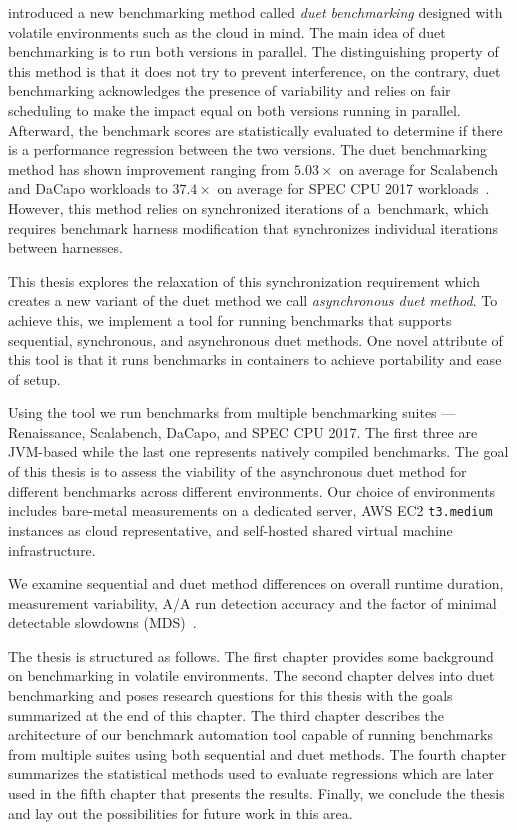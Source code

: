 \citet{bulej2020duet} introduced a new benchmarking method called \emph{duet benchmarking} designed with volatile environments such as the cloud in mind.
The main idea of duet benchmarking is to run both versions in parallel.
The distinguishing property of this method is that it does not try to prevent interference, on the contrary, duet benchmarking acknowledges the presence of variability and relies on fair scheduling to make the impact equal on both versions running in parallel.
Afterward, the benchmark scores are statistically evaluated to determine if there is a performance regression between the two versions.
The duet benchmarking method has shown improvement ranging from $5.03 \times$ on average for Scalabench and DaCapo workloads to $37.4 \times$ on average for SPEC CPU 2017 workloads~\cite{bulej2020duet}.
However, this method relies on synchronized iterations of a~benchmark, which requires benchmark harness modification that synchronizes individual iterations between harnesses.

This thesis explores the relaxation of this synchronization requirement which creates a new variant of the duet method we call \emph{asynchronous duet method}.
To achieve this, we implement a tool for running benchmarks that supports sequential, synchronous, and asynchronous duet methods.
One novel attribute of this tool is that it runs benchmarks in containers to achieve portability and ease of setup.

Using the tool we run benchmarks from multiple benchmarking suites --- Renaissance, Scalabench, DaCapo, and SPEC CPU 2017.
The first three are \mbox{JVM-based} while the last one represents natively compiled benchmarks.
The goal of this thesis is to assess the viability of the asynchronous duet method for different benchmarks across different environments.
Our choice of environments includes \mbox{bare-metal} measurements on a dedicated server, AWS EC2 \lstinline{t3.medium} instances as cloud representative, and self-hosted shared virtual machine infrastructure.

We examine sequential and duet method differences on overall runtime duration, measurement variability, A/A run detection accuracy and the factor of minimal detectable slowdowns (MDS)~\cite{laaber2019software}.

The thesis is structured as follows.
The first chapter provides some background on benchmarking in volatile environments.
The second chapter delves into duet benchmarking and poses research questions for this thesis with the goals summarized at the end of this chapter.
The third chapter describes the architecture of our benchmark automation tool capable of running benchmarks from multiple suites using both sequential and duet methods.
The fourth chapter summarizes the statistical methods used to evaluate regressions which are later used in the fifth chapter that presents the results.
Finally, we conclude the thesis and lay out the possibilities for future work in this area.
